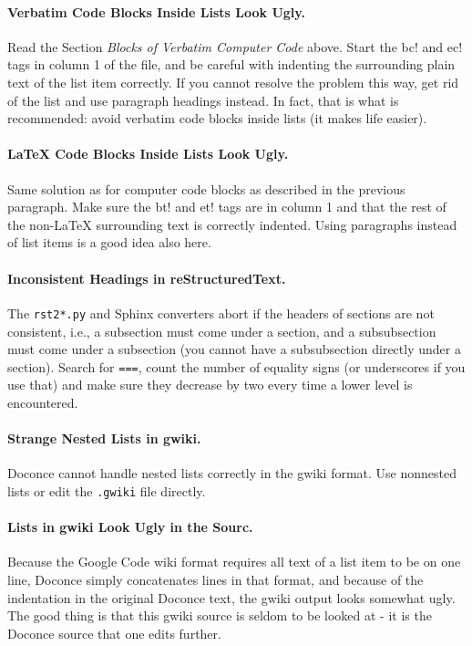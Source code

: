 \documentclass{article}
\begin{document}
\paragraph{Verbatim Code Blocks Inside Lists Look Ugly.}
Read the Section \emph{Blocks of Verbatim Computer Code} above.  Start the
{\fontsize{10pt}{10pt}\verb!!bc!} and {\fontsize{10pt}{10pt}\verb!!ec!} tags in column 1 of the file, and be careful with
indenting the surrounding plain text of the list item correctly. If
you cannot resolve the problem this way, get rid of the list and use
paragraph headings instead. In fact, that is what is recommended:
avoid verbatim code blocks inside lists (it makes life easier).

\paragraph{LaTeX Code Blocks Inside Lists Look Ugly.}
Same solution as for computer code blocks as described in the
previous paragraph. Make sure the {\fontsize{10pt}{10pt}\verb!!bt!} and {\fontsize{10pt}{10pt}\verb!!et!} tags are in column 1
and that the rest of the non-{\LaTeX} surrounding text is correctly indented.
Using paragraphs instead of list items is a good idea also here.

\paragraph{Inconsistent Headings in reStructuredText.}
The {\fontsize{10pt}{10pt}\verb!rst2*.py!} and Sphinx converters abort if the headers of sections
are not consistent, i.e., a subsection must come under a section,
and a subsubsection must come under a subsection (you cannot have
a subsubsection directly under a section). Search for {\fontsize{10pt}{10pt}\verb!===!},
count the number of equality signs (or underscores if you use that)
and make sure they decrease by two every time a lower level is encountered.

\paragraph{Strange Nested Lists in gwiki.}
Doconce cannot handle nested lists correctly in the gwiki format.
Use nonnested lists or edit the {\fontsize{10pt}{10pt}\verb!.gwiki!} file directly.

\paragraph{Lists in gwiki Look Ugly in the Sourc.}
Because the Google Code wiki format requires all text of a list item to
be on one line, Doconce simply concatenates lines in that format,
and because of the indentation in the original Doconce text, the gwiki
output looks somewhat ugly. The good thing is that this gwiki source
is seldom to be looked at - it is the Doconce source that one edits
further.
\end{document}
